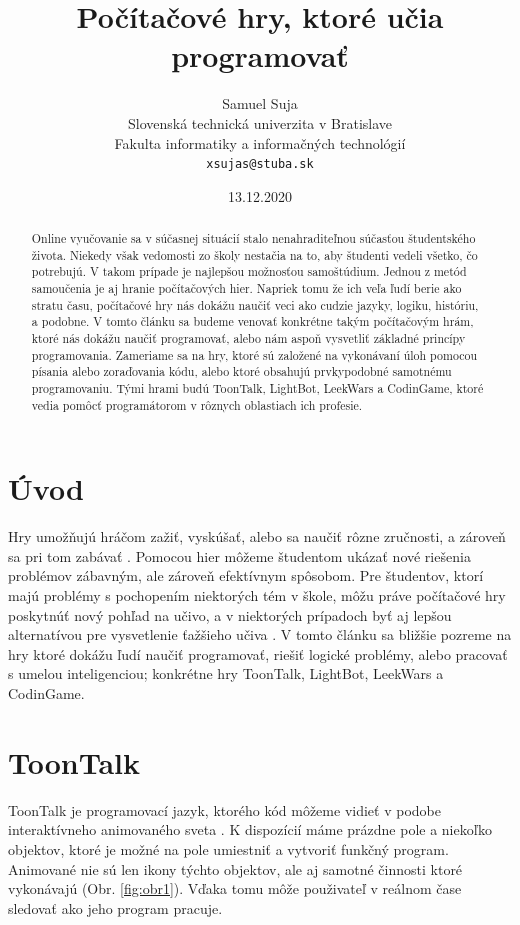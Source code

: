 \documentclass[slovak,a4paper,10pt]{article}
\title{Počítačové hry, ktoré učia programovať}
\author{Samuel Suja\\
	{\small Slovenská technická univerzita v Bratislave}\\
	{\small Fakulta informatiky a informačných technológií}\\
	{\small \texttt{xsujas@stuba.sk}}
}
\date{13.12.2020}
\begin{document}
\maketitle

\begin{abstract}

Online vyučovanie sa v súčasnej situácií stalo nenahraditeľnou súčasťou študentského života. Niekedy však vedomosti zo školy nestačia na to, aby študenti vedeli všetko, čo potrebujú. V takom prípade je najlepšou možnosťou samoštúdium. Jednou z metód samoučenia je aj hranie počítačových hier. Napriek tomu že ich veľa ľudí berie ako stratu času, počítačové hry nás dokážu naučiť veci ako cudzie jazyky, logiku, históriu, a podobne. V tomto článku sa budeme venovať konkrétne takým počítačovým hrám, ktoré nás dokážu naučiť programovať, alebo nám aspoň vysvetliť základné princípy programovania. Zameriame sa na hry, ktoré sú založené na vykonávaní úloh pomocou písania alebo zoraďovania kódu, alebo ktoré obsahujú prvkypodobné samotnému programovaniu. Tými hrami budú ToonTalk, LightBot, LeekWars a CodinGame, ktoré vedia pomôcť programátorom v rôznych oblastiach ich profesie.

\end{abstract}

\section{Úvod}
Hry umožňujú hráčom zažiť, vyskúšať, alebo sa naučiť rôzne zručnosti, a zároveň sa pri tom zabávať \cite{burgos2007re}. Pomocou hier môžeme študentom ukázať nové riešenia problémov zábavným, ale zároveň efektívnym spôsobom. Pre študentov, ktorí majú problémy s pochopením niektorých tém v škole, môžu práve počítačové hry poskytnúť nový pohľad na učivo, a v niektorých prípadoch byť aj lepšou alternatívou pre vysvetlenie ťažšieho učiva \cite{seng2014computer}. V tomto článku sa bližšie pozreme na hry ktoré dokážu ľudí naučiť programovať, riešiť logické problémy, alebo pracovať s umelou inteligenciou; konkrétne hry ToonTalk, LightBot, LeekWars a CodinGame.

\section{ToonTalk}
ToonTalk je programovací jazyk, ktorého kód môžeme vidieť v podobe interaktívneho animovaného sveta \cite{kahn1999computer}. K dispozícií máme prázdne pole a niekoľko objektov, ktoré je možné na pole umiestniť a vytvoriť funkčný program. Animované nie sú len ikony týchto objektov, ale aj samotné činnosti ktoré vykonávajú (Obr. \ref{fig:obr1}). Vďaka tomu môže použivateľ v reálnom čase sledovať ako jeho program pracuje.
\end{document}
